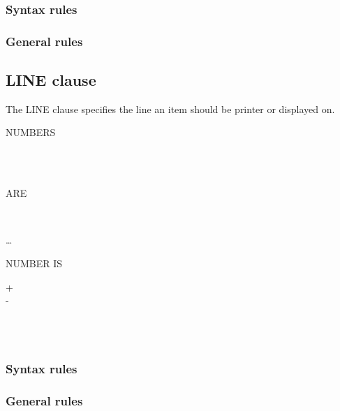 \subsubsection{Syntax rules}

\subsubsection{General rules}

\subsection{LINE clause}

The LINE clause specifies the line an item should be printer or displayed on.

\begin{syntax}
  \begin{1=}
     NUMBERS
    \begin{0-1}
       \\
    \end{0-1} \\

     ARE
  \end{1=}
  \begin{1=}
    \begin{0-1}
    \end{0-1}
    \integer \\
     
  \end{1=}\ldots
\end{syntax}

\begin{syntax}
   NUMBER IS
  \begin{0-1}
    + \\
    - \\
     \\
  \end{0-1}
  \begin{1=}
    \identifier \\
    \integer
  \end{1=}
\end{syntax}

\subsubsection{Syntax rules}

\subsubsection{General rules}

